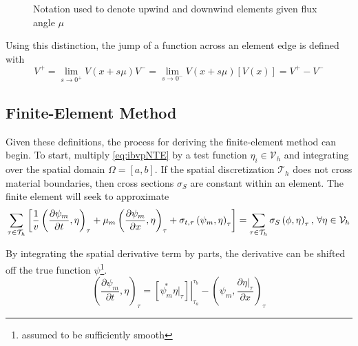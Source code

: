 \documentclass{article}
\newcommand{\mfesv}{\mathcal{V}_h}
\newcommand{\tauh}{\mathcal{T}_h}
\newcommand{\pdiff}[2]{\frac{\partial#1}{\partial#2}}
\newcommand{\ddx}[1]{\pdiff{#1}{x}}
\newcommand{\ddt}[1]{\pdiff{#1}{t}}
\newcommand{\dpmdx}{\ddx{\psi_m}}
\newcommand{\dpmdt}{\ddt{\psi_m}}
\newcommand{\sumTaus}{\sum_{\tauinT}}
\newcommand{\tfem}{finite-element method }
\newcommand{\tauinT}{\tau\in\tauh}
\newcommand{\invv}{\frac{1}{v}}
\newcommand{\innerProd}[2]{\left(#1,#2\right)}
\newcommand{\tauInt}[2]{\innerProd{#1}{#2}_\tau}
\newcommand{\inTau}[1]{\left.#1\right\vert_{\tau}}
\newcommand{\jump}[1]{\left[#1\right]}
\begin{document}
\begin{figure}
    \centering
    \begin{tikzpicture}
        
    \end{tikzpicture}
    \caption{Notation used to denote upwind and downwind elements given flux angle $\mu$}
    \label{fig:upwDnw}
\end{figure}

Using this distinction, the jump of a function across an element edge is defined with
\begin{subequations}
    \begin{equation}
        V^+ = \lim_{s\rightarrow 0^+}V(x+s\mu)
    \end{equation}
    \begin{equation}
        V^- = \lim_{s\rightarrow 0^-}V(x+s\mu)
    \end{equation}
    \begin{equation}
        \label{eq:jumpDef}
        \jump{V(x)} = V^+-V^-
    \end{equation}
\end{subequations}

\subsection{Finite-Element Method}

Given these definitions, the process for deriving the \tfem can begin. 
To start, multiply \cref{eq:ibvpNTE} by a test function $\eta_i\in\mfesv$ and integrating over
the spatial domain $\Omega=[a,b]$.
If the spatial discretization $\mathcal{T}_h$ does not cross material boundaries, then cross sections $\sigma_S$
are constant within an element.
The finite element will seek to approximate
\begin{equation}
    \label{eq:derive0}
    \sumTaus\left[
        \invv\tauInt{\dpmdt}{\eta}
        +\mu_m\tauInt{\dpmdx}{\eta}
        +\sigma_{t,\tau}\tauInt{\psi_m}{\eta}
    \right]
    = \sumTaus\sigma_S\tauInt{\phi}{\eta}
    \forEtaInV
\end{equation}

By integrating the spatial derivative term by parts, the derivative can be shifted off
the true function $\psi$\footnote{assumed to be sufficiently smooth}.
\begin{equation}
    \tauInt{\dpmdt}{\eta} = \left.\left[\overset{*}{\psi_m}\inTau{\eta}\right]\right\vert_{\tau_a}^{\tau_b}
        -\tauInt{\psi_m}{\ddx{\inTau{\eta}}}
\end{equation}
\end{document}
